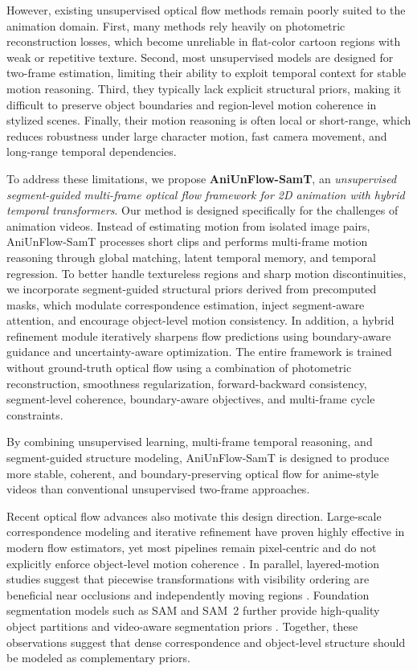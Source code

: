 However, existing unsupervised optical flow methods remain poorly suited to the animation domain. First, many methods rely heavily on photometric reconstruction losses, which become unreliable in flat-color cartoon regions with weak or repetitive texture. Second, most unsupervised models are designed for two-frame estimation, limiting their ability to exploit temporal context for stable motion reasoning. Third, they typically lack explicit structural priors, making it difficult to preserve object boundaries and region-level motion coherence in stylized scenes. Finally, their motion reasoning is often local or short-range, which reduces robustness under large character motion, fast camera movement, and long-range temporal dependencies.

To address these limitations, we propose \textbf{AniUnFlow-SamT}, an \emph{unsupervised segment-guided multi-frame optical flow framework for 2D animation with hybrid temporal transformers}. Our method is designed specifically for the challenges of animation videos. Instead of estimating motion from isolated image pairs, AniUnFlow-SamT processes short clips and performs multi-frame motion reasoning through global matching, latent temporal memory, and temporal regression. To better handle textureless regions and sharp motion discontinuities, we incorporate segment-guided structural priors derived from precomputed masks, which modulate correspondence estimation, inject segment-aware attention, and encourage object-level motion consistency. In addition, a hybrid refinement module iteratively sharpens flow predictions using boundary-aware guidance and uncertainty-aware optimization. The entire framework is trained without ground-truth optical flow using a combination of photometric reconstruction, smoothness regularization, forward-backward consistency, segment-level coherence, boundary-aware objectives, and multi-frame cycle constraints.

By combining unsupervised learning, multi-frame temporal reasoning, and segment-guided structure modeling, AniUnFlow-SamT is designed to produce more stable, coherent, and boundary-preserving optical flow for anime-style videos than conventional unsupervised two-frame approaches.

Recent optical flow advances also motivate this design direction. Large-scale correspondence modeling and iterative refinement have proven highly effective in modern flow estimators, yet most pipelines remain pixel-centric and do not explicitly enforce object-level motion coherence \cite{pwcnet,raft,flowformer}. In parallel, layered-motion studies suggest that piecewise transformations with visibility ordering are beneficial near occlusions and independently moving regions \cite{wang1994representing,sevillalara2016optical}. Foundation segmentation models such as SAM and SAM~2 further provide high-quality object partitions and video-aware segmentation priors \cite{sam,ravi2024sam2}. Together, these observations suggest that dense correspondence and object-level structure should be modeled as complementary priors.

